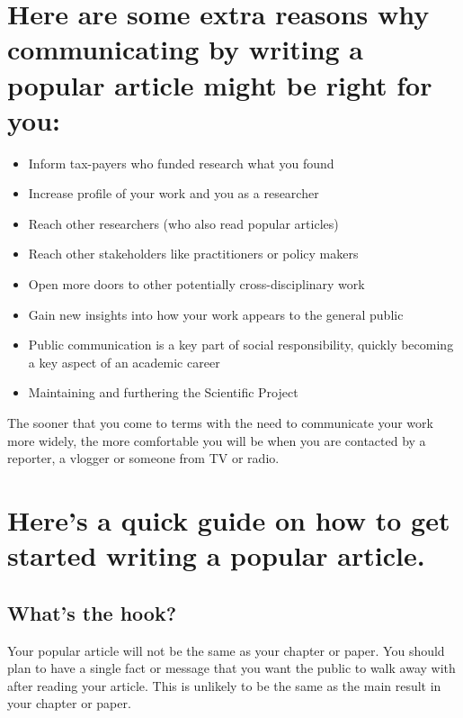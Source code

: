 \documentclass[
]{krantz}
\providecommand{\tightlist}{%
  \setlength{\itemsep}{0pt}\setlength{\parskip}{0pt}}
\begin{document}
\hypertarget{here-are-some-extra-reasons-why-communicating-by-writing-a-popular-article-might-be-right-for-you}{%
\section{Here are some extra reasons why communicating by writing a popular article might be right for you:}\label{here-are-some-extra-reasons-why-communicating-by-writing-a-popular-article-might-be-right-for-you}}

\begin{itemize}
\tightlist
\item
  Inform tax-payers who funded research what you found
\item
  Increase profile of your work and you as a researcher
\item
  Reach other researchers (who also read popular articles)
\item
  Reach other stakeholders like practitioners or policy makers
\item
  Open more doors to other potentially cross-disciplinary work
\item
  Gain new insights into how your work appears to the general public
\item
  Public communication is a key part of social responsibility, quickly becoming a key aspect of an academic career
\item
  Maintaining and furthering the Scientific Project
\end{itemize}

The sooner that you come to terms with the need to communicate your work more widely, the more comfortable you will be when you are contacted by a reporter, a vlogger or someone from TV or radio.

\hypertarget{heres-a-quick-guide-on-how-to-get-started-writing-a-popular-article.}{%
\section{Here's a quick guide on how to get started writing a popular article.}\label{heres-a-quick-guide-on-how-to-get-started-writing-a-popular-article.}}

\hypertarget{whats-the-hook}{%
\subsection{What's the hook?}\label{whats-the-hook}}

Your popular article will not be the same as your chapter or paper. You should plan to have a single fact or message that you want the public to walk away with after reading your article. This is unlikely to be the same as the main result in your chapter or paper.
\end{document}
